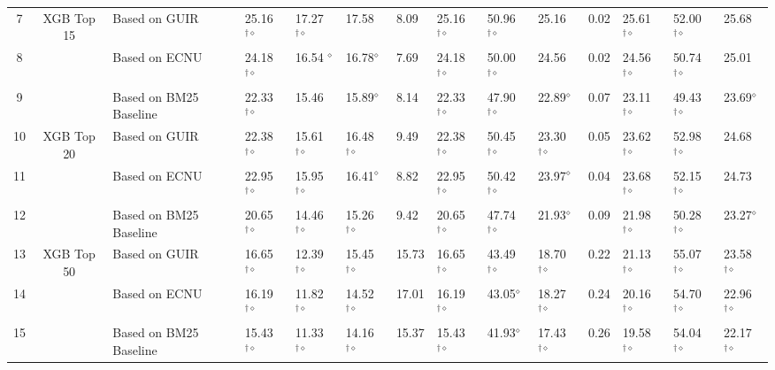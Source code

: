 \begin{table*}
{\begin{tabular}{ccllllllllllll}
\midrule 
7  & \multirow{3}{*}{XGB Top 15}  & Based on GUIR  & 25.16$^{\dagger\diamond}$  & 17.27$^{\dagger\diamond}$  & 17.58  & 8.09 & 25.16$^{\dagger\diamond}$  & 50.96$^{\dagger\diamond}$  & 25.16  & 0.02  & 25.61$^{\dagger\diamond}$  & 52.00$^{\dagger\diamond}$  & 25.68\tabularnewline
8  &  & Based on ECNU  & 24.18$^{\dagger\diamond}$  & 16.54 $^{\diamond}$  & 16.78$^{\diamond}$  & 7.69 & 24.18$^{\dagger\diamond}$  & 50.00$^{\dagger\diamond}$  & 24.56  & 0.02  & 24.56$^{\dagger\diamond}$  & 50.74$^{\dagger\diamond}$  & 25.01\tabularnewline
9  &  & Based on BM25 Baseline  & 22.33$^{\dagger\diamond}$  & 15.46  & 15.89$^{\diamond}$  & 8.14 & 22.33$^{\dagger\diamond}$  & 47.90$^{\dagger\diamond}$  & 22.89$^{\diamond}$  & 0.07  & 23.11$^{\dagger\diamond}$  & 49.43$^{\dagger\diamond}$  & 23.69$^{\diamond}$\tabularnewline
\midrule 
10  & \multirow{3}{*}{XGB Top 20}  & Based on GUIR  & 22.38$^{\dagger\diamond}$  & 15.61$^{\dagger\diamond}$  & 16.48$^{\dagger\diamond}$  & 9.49 & 22.38$^{\dagger\diamond}$  & 50.45$^{\dagger\diamond}$  & 23.30$^{\dagger\diamond}$  & 0.05  & 23.62$^{\dagger\diamond}$  & 52.98$^{\dagger\diamond}$  & 24.68\tabularnewline
11  &  & Based on ECNU  & 22.95$^{\dagger\diamond}$  & 15.95$^{\dagger\diamond}$  & 16.41$^{\diamond}$  & 8.82 & 22.95$^{\dagger\diamond}$  & 50.42$^{\dagger\diamond}$  & 23.97$^{\diamond}$  & 0.04  & 23.68$^{\dagger\diamond}$  & 52.15$^{\dagger\diamond}$  & 24.73\tabularnewline
12  &  & Based on BM25 Baseline  & 20.65$^{\dagger\diamond}$  & 14.46$^{\dagger\diamond}$  & 15.26$^{\dagger\diamond}$  & 9.42 & 20.65$^{\dagger\diamond}$  & 47.74$^{\dagger\diamond}$  & 21.93$^{\diamond}$  & 0.09  & 21.98$^{\dagger\diamond}$  & 50.28$^{\dagger\diamond}$  & 23.27$^{\diamond}$\tabularnewline
\midrule 
13  & \multirow{3}{*}{XGB Top 50}  & Based on GUIR  & 16.65$^{\dagger\diamond}$  & 12.39$^{\dagger\diamond}$  & 15.45$^{\dagger\diamond}$  & 15.73 & 16.65$^{\dagger\diamond}$  & 43.49$^{\dagger\diamond}$  & 18.70$^{\dagger\diamond}$  & 0.22  & 21.13$^{\dagger\diamond}$  & 55.07$^{\dagger\diamond}$  & 23.58$^{\dagger\diamond}$\tabularnewline
14  &  & Based on ECNU  & 16.19$^{\dagger\diamond}$  & 11.82$^{\dagger\diamond}$  & 14.52$^{\dagger\diamond}$  & 17.01 & 16.19$^{\dagger\diamond}$  & 43.05$^{\diamond}$  & 18.27$^{\dagger\diamond}$  & 0.24  & 20.16$^{\dagger\diamond}$  & 54.70$^{\dagger\diamond}$  & 22.96$^{\dagger\diamond}$\tabularnewline
15  &  & Based on BM25 Baseline  & 15.43$^{\dagger\diamond}$  & 11.33$^{\dagger\diamond}$  & 14.16$^{\dagger\diamond}$  & 15.37 & 15.43$^{\dagger\diamond}$  & 41.93$^{\diamond}$  & 17.43$^{\dagger\diamond}$  & 0.26  & 19.58$^{\dagger\diamond}$  & 54.04$^{\dagger\diamond}$  & 22.17$^{\dagger\diamond}$\tabularnewline

\end{tabular}}
\end{table*}
